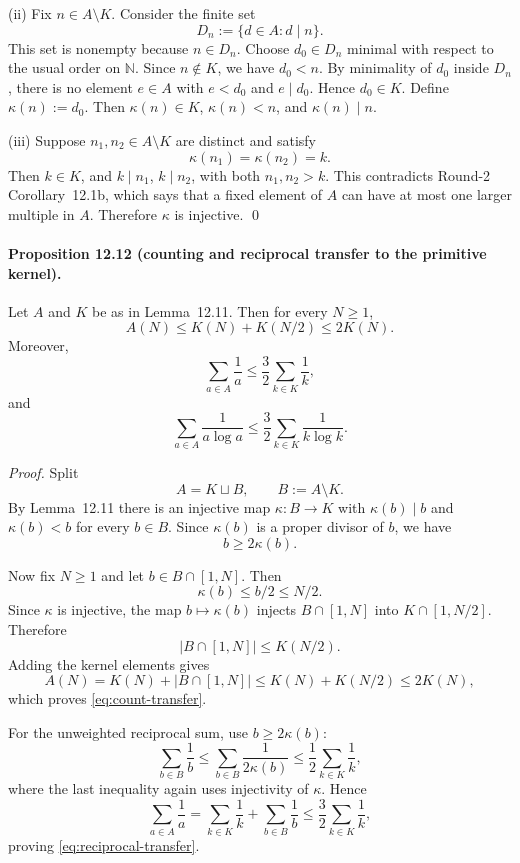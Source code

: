 (ii) Fix $n\in A\setminus K$.
Consider the finite set
\[
D_n:=\{d\in A:d\mid n\}.
\]
This set is nonempty because $n\in D_n$.
Choose $d_0\in D_n$ minimal with respect to the usual order on $\mathbb N$.
Since $n\notin K$, we have $d_0<n$.
By minimality of $d_0$ inside $D_n$, there is no element $e\in A$ with $e<d_0$ and $e\mid d_0$.
Hence $d_0\in K$.
Define $\kappa(n):=d_0$.
Then $\kappa(n)\in K$, $\kappa(n)<n$, and $\kappa(n)\mid n$.

(iii) Suppose $n_1,n_2\in A\setminus K$ are distinct and satisfy
\[
\kappa(n_1)=\kappa(n_2)=k.
\]
Then $k\in K$, and $k\mid n_1$, $k\mid n_2$, with both $n_1,n_2>k$.
This contradicts Round-2 Corollary~12.1b, which says that a fixed element of $A$ can have at most one larger multiple in $A$.
Therefore $\kappa$ is injective.
\qed

\bigskip

\paragraph{\textbf{Proposition 12.12 (counting and reciprocal transfer to the primitive kernel).}}
Let $A$ and $K$ be as in Lemma~12.11.
Then for every $N\ge 1$,
\begin{equation}
\label{eq:count-transfer}
A(N)\le K(N)+K(N/2)\le 2K(N).
\end{equation}
Moreover,
\begin{equation}
\label{eq:reciprocal-transfer}
\sum_{a\in A}\frac1a\le \frac32\sum_{k\in K}\frac1k,
\end{equation}
and
\begin{equation}
\label{eq:weighted-transfer}
\sum_{a\in A}\frac1{a\log a}\le \frac32\sum_{k\in K}\frac1{k\log k}.
\end{equation}

\emph{Proof.}
Split
\[
A=K\sqcup B,
\qquad B:=A\setminus K.
\]
By Lemma~12.11 there is an injective map $\kappa:B\to K$ with $\kappa(b)\mid b$ and $\kappa(b)<b$ for every $b\in B$.
Since $\kappa(b)$ is a proper divisor of $b$, we have
\[
b\ge 2\kappa(b).
\]

Now fix $N\ge 1$ and let $b\in B\cap[1,N]$.
Then
\[
\kappa(b)\le b/2\le N/2.
\]
Since $\kappa$ is injective, the map $b\mapsto \kappa(b)$ injects $B\cap[1,N]$ into $K\cap[1,N/2]$.
Therefore
\[
|B\cap[1,N]|\le K(N/2).
\]
Adding the kernel elements gives
\[
A(N)=K(N)+|B\cap[1,N]|\le K(N)+K(N/2)\le 2K(N),
\]
which proves \eqref{eq:count-transfer}.

For the unweighted reciprocal sum, use $b\ge 2\kappa(b)$:
\[
\sum_{b\in B}\frac1b
\le \sum_{b\in B}\frac1{2\kappa(b)}
\le \frac12\sum_{k\in K}\frac1k,
\]
where the last inequality again uses injectivity of $\kappa$.
Hence
\[
\sum_{a\in A}\frac1a
= \sum_{k\in K}\frac1k+\sum_{b\in B}\frac1b
\le \frac32\sum_{k\in K}\frac1k,
\]
proving \eqref{eq:reciprocal-transfer}.

